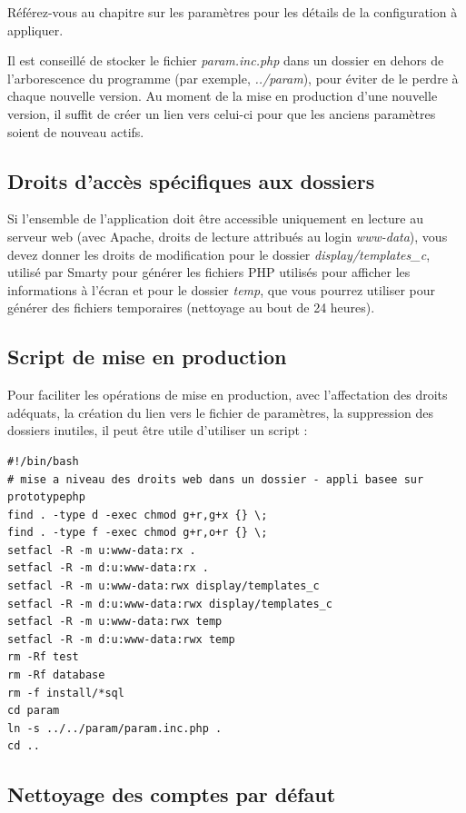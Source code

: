 Référez-vous au chapitre sur les paramètres pour les détails de la configuration à appliquer.

Il est conseillé de stocker le fichier \textit{param.inc.php} dans un dossier en dehors de l'arborescence du programme (par exemple, \textit{../param}), pour éviter de le perdre à chaque nouvelle version. 
Au moment de la mise en production d'une nouvelle version, il suffit de créer un lien vers celui-ci pour que les anciens paramètres soient de nouveau actifs.

\subsection{Droits d'accès spécifiques aux dossiers}
Si l'ensemble de l'application doit être accessible uniquement en lecture au serveur web (avec Apache, droits de lecture attribués au login \textit{www-data}), vous devez donner les droits de modification pour le dossier \textit{display/templates\_c},  utilisé par Smarty pour générer les fichiers PHP utilisés pour afficher les informations à l'écran et pour le dossier \textit{temp}, que vous pourrez utiliser pour générer des fichiers temporaires (nettoyage au bout de 24 heures).

\subsection{Script de mise en production}

Pour faciliter les opérations de mise en production, avec l'affectation des droits adéquats, la création du lien vers le fichier de paramètres, la suppression des dossiers inutiles, il peut être utile d'utiliser un script :

\begin{lstlisting}
#!/bin/bash
# mise a niveau des droits web dans un dossier - appli basee sur prototypephp
find . -type d -exec chmod g+r,g+x {} \;
find . -type f -exec chmod g+r,o+r {} \;
setfacl -R -m u:www-data:rx .
setfacl -R -m d:u:www-data:rx .
setfacl -R -m u:www-data:rwx display/templates_c
setfacl -R -m d:u:www-data:rwx display/templates_c
setfacl -R -m u:www-data:rwx temp
setfacl -R -m d:u:www-data:rwx temp
rm -Rf test
rm -Rf database
rm -f install/*sql
cd param
ln -s ../../param/param.inc.php .
cd ..

\end{lstlisting}


\subsection{Nettoyage des comptes par défaut}

